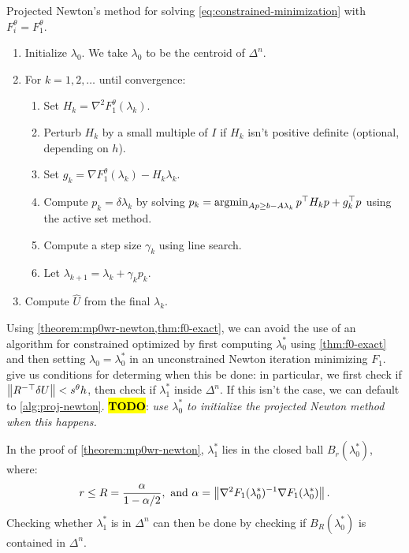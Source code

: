 \documentclass[eikonal.tex]{subfiles}
\begin{document}
\begin{algorithm}[H]
  \caption{Projected Newton's method for solving
    \cref{eq:constrained-minimization} with
    $F_i^\theta = F_1^\theta$.}\label{alg:proj-newton}
  \begin{enumerate}[nolistsep]
  \item Initialize $\lambda_0$. We take $\lambda_0$ to be the centroid
    of $\Delta^n$.
  \item For $k = 1, 2, \hdots$ until convergence:
    \begin{enumerate}
    \item Set $H_k = \nabla^2 F_1^\theta(\lambda_k)$.
    \item Perturb $H_k$ by a small multiple of $I$ if $H_k$ isn't
      positive definite (optional, depending on $h$).
    \item Set $g_k = \nabla F_1^\theta(\lambda_k) - H_k \lambda_k$.
    \item Compute $p_k = \delta \lambda_k$ by solving
      $p_k = \operatorname{argmin}_{Ap \geq b - A\lambda_k} p^\top H_k p + g_k^\top
      p$ using the active set method.
    \item Compute a step size $\gamma_k$ using line search.
    \item Let $\lambda_{k + 1} = \lambda_k + \gamma_k p_k$.
    \end{enumerate}
  \item Compute $\hat{U}$ from the final $\lambda_k$.
  \end{enumerate}
\end{algorithm}

Using \cref{theorem:mp0wr-newton,thm:f0-exact}, we can avoid the use
of an algorithm for constrained optimized by first computing
$\lambda_0^*$ using \cref{thm:f0-exact} and then setting
$\lambda_0 = \lambda_0^*$ in an unconstrained Newton iteration
minimizing $F_1$.  give us
conditions for determing when this be done: in particular, we first
check if $\left\|R^{-\top} \delta U\right\| < s^\theta h$, then check if
$\lambda_1^*$ inside $\Delta^n$. If this isn't the case, we can
default to \cref{alg:proj-newton}. \hl{\textbf{TODO}}: \emph{use
  $\lambda_0^*$ to initialize the projected Newton method when this
  happens.}

In the proof of \cref{theorem:mp0wr-newton}, $\lambda_1^*$ lies in the
closed ball $B_r(\lambda_0^*)$, where:
\begin{equation}
  r \leq R = \frac{\alpha}{1 - \alpha/2}, \mbox{ and } \alpha = \left\|\nabla^2 F_1(\lambda_0^*)^{-1} \nabla F_1(\lambda_0^*)\right\|.
\end{equation}
Checking whether $\lambda_1^*$ is in $\Delta^n$ can then be done by
checking if $B_R(\lambda_0^*)$ is contained in $\Delta^n$.
\end{document}
